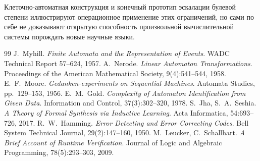 \documentclass[11pt,a4paper]{article}
\begin{document}
Клеточно-автоматная конструкция и конечный прототип эскалации булевой степени иллюстрируют операционное применение этих ограничений, но сами по себе не доказывают открытую способность произвольной вычислительной системы порождать новые научные языки.

\begin{thebibliography}{99}\setlength{\itemsep}{1pt}
 J.~Myhill. \emph{Finite Automata and the Representation of Events}. WADC Technical Report 57--624, 1957.
 A.~Nerode. \emph{Linear Automaton Transformations}. Proceedings of the American Mathematical Society, 9(4):541--544, 1958.
 E.~F.~Moore. \emph{Gedanken-experiments on Sequential Machines}. Automata Studies, pp.~129--153, 1956.
 E.~M.~Gold. \emph{Complexity of Automaton Identification from Given Data}. Information and Control, 37(3):302--320, 1978.
 S.~Jha, S.~A.~Seshia. \emph{A Theory of Formal Synthesis via Inductive Learning}. Acta Informatica, 54:693--726, 2017.
 R.~W.~Hamming. \emph{Error Detecting and Error Correcting Codes}. Bell System Technical Journal, 29(2):147--160, 1950.
 M.~Leucker, C.~Schallhart. \emph{A Brief Account of Runtime Verification}. Journal of Logic and Algebraic Programming, 78(5):293--303, 2009.
\end{thebibliography}
\end{document}
